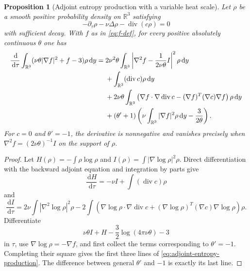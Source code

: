 \documentclass[11pt]{amsart}
\numberwithin{equation}{section}
\theoremstyle{plain}
\newtheorem{proposition}[proposition]{Proposition}
\theoremstyle{definition}
\theoremstyle{remark}
\newcommand{\R}{\mathbb R}
\newcommand{\dd}{\,\mathrm d}
\newcommand{\diver}{\operatorname{div}}
\begin{document}
\begin{proposition}[Adjoint entropy production with a variable heat scale]
\label{prop:adjoint-entropy-production}
Let \(\rho\) be a smooth positive probability density on \(\R^3\) satisfying
\[
 -\partial_\tau\rho-\nu\Delta\rho-\diver(c\rho)=0
\]
with sufficient decay.  With \(f\) as in \eqref{eq:f-def}, for every
positive absolutely continuous \(\theta\) one has
\begin{align}
 \frac{\dd}{\dd\tau}
 \int_{\R^3}(\nu\theta|\nabla f|^2+f-3)\rho\dd y
 ={}&2\nu^2\theta\int_{\R^3}
 \left|\nabla^2f-\frac{1}{2\nu\theta}I\right|^2\rho\dd y
 \notag\\
 &+\int_{\R^3}(\diver c)\rho\dd y
 \notag\\
 &+2\nu\theta\int_{\R^3}
 \left(\nabla f\cdot\nabla\diver c
 -(\nabla f)^{T}(\nabla c)\nabla f\right)\rho\dd y
 \notag\\
 &+(\theta'+1)
 \left(\nu\int_{\R^3}|\nabla f|^2\rho\dd y
       -\frac{3}{2\theta}\right).
 \label{eq:adjoint-entropy-production}
\end{align}
For \(c=0\) and \(\theta'=-1\), the derivative is nonnegative and vanishes precisely when
\(\nabla^2f=(2\nu\theta)^{-1}I\) on the support of \(\rho\).
\end{proposition}

\begin{proof}
Let \(H(\rho)=-\int\rho\log\rho\) and
\(I(\rho)=\int|\nabla\log\rho|^2\rho\).  Direct differentiation with the
backward adjoint equation and integration by parts give
\[
 \frac{\dd H}{\dd\tau}
 =-\nu I+\int(\diver c)\rho
\]
and
\[
 \frac{\dd I}{\dd\tau}
 =2\nu\int|\nabla^2\log\rho|^2\rho
 -2\int\left(
 \nabla\log\rho\cdot\nabla\diver c
 +(\nabla\log\rho)^{T}(\nabla c)\nabla\log\rho
 \right)\rho.
\]
Differentiate
\[
 \nu\theta I+H-\frac32\log(4\pi\nu\theta)-3
\]
in \(\tau\), use \(\nabla\log\rho=-\nabla f\), and first collect the
terms corresponding to \(\theta'=-1\).  Completing their square gives the
first three lines of \eqref{eq:adjoint-entropy-production}.  The difference
between general \(\theta'\) and \(-1\) is exactly its last line.
\end{proof}
\end{document}
